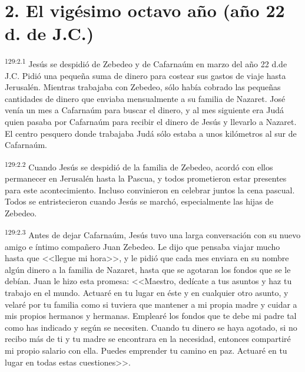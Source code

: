 \section*{2. El vigésimo octavo año (año 22 d. de J.C.)}
\par 
\textsuperscript{129:2.1} Jesús se despidió de Zebedeo y de Cafarnaúm en marzo del año 22 d.de J.C. Pidió una pequeña suma de dinero para costear sus gastos de viaje hasta Jerusalén. Mientras trabajaba con Zebedeo, sólo había cobrado las pequeñas cantidades de dinero que enviaba mensualmente a su familia de Nazaret. José venía un mes a Cafarnaúm para buscar el dinero, y al mes siguiente era Judá quien pasaba por Cafarnaúm para recibir el dinero de Jesús y llevarlo a Nazaret. El centro pesquero donde trabajaba Judá sólo estaba a unos kilómetros al sur de Cafarnaúm.

\par 
\textsuperscript{129:2.2} Cuando Jesús se despidió de la familia de Zebedeo, acordó con ellos permanecer en Jerusalén hasta la Pascua, y todos prometieron estar presentes para este acontecimiento. Incluso convinieron en celebrar juntos la cena pascual. Todos se entristecieron cuando Jesús se marchó, especialmente las hijas de Zebedeo.

\par 
\textsuperscript{129:2.3} Antes de dejar Cafarnaúm, Jesús tuvo una larga conversación con su nuevo amigo e íntimo compañero Juan Zebedeo. Le dijo que pensaba viajar mucho hasta que <<llegue mi hora>>, y le pidió que cada mes enviara en su nombre algún dinero a la familia de Nazaret, hasta que se agotaran los fondos que se le debían. Juan le hizo esta promesa: <<Maestro, dedícate a tus asuntos y haz tu trabajo en el mundo. Actuaré en tu lugar en éste y en cualquier otro asunto, y velaré por tu familia como si tuviera que mantener a mi propia madre y cuidar a mis propios hermanos y hermanas. Emplearé los fondos que te debe mi padre tal como has indicado y según se necesiten. Cuando tu dinero se haya agotado, si no recibo más de ti y tu madre se encontrara en la necesidad, entonces compartiré mi propio salario con ella. Puedes emprender tu camino en paz. Actuaré en tu lugar en todas estas cuestiones>>.

